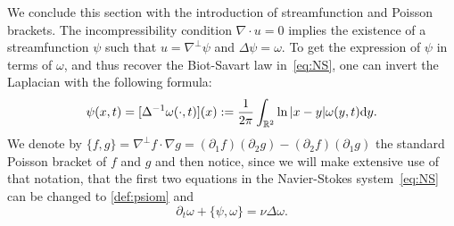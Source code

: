 \documentclass[11pt,reqno,a4paper]{amsart}
\def\dd{{\rm d}}
\def\de{{\partial}}
\def\RR {\mathbb{R}}
\newcommand{\1}{\mathbbm{1}}
\theoremstyle{definition}
\theoremstyle{definition}
\numberwithin{equation}{section}
\begin{document}
We conclude this section with the introduction of streamfunction and Poisson brackets. The incompressibility condition $\nabla \cdot u = 0$ implies the existence of a streamfunction $\psi$ such that $u = \nabla^\perp \psi$ and $\Delta \psi = \omega$. To get the expression of $\psi$ in terms of $\omega$, and thus recover the Biot-Savart law in~\cref{eq:NS}, one can invert the Laplacian with  the following formula:
\begin{equation}
\label{def:psiom}
    \psi(x,t)= [\Delta^{-1} \omega(\cdot , t)](x) := \frac{1}{2\pi}\int_{\RR^2}\ln|x-y|\omega(y,t) \dd y.
\end{equation}
We denote by $\{f,g\}=\nabla^\perp f\cdot \nabla g=(\de_1 f)(\de_2 g)-(\de_2f)(\de_1 g)$ the standard Poisson bracket of $f$ and $g$ and then notice, since we will make extensive use of that notation, that the first two equations in the Navier-Stokes system~\cref{eq:NS} can be changed to \cref{def:psiom} and
\begin{equation}
    \partial_t \omega + \{\psi,\omega\} = \nu \Delta \omega.
\end{equation}
\end{document}
